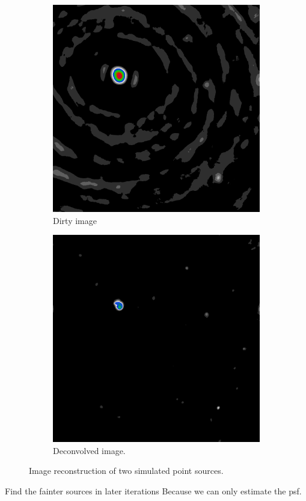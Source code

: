 \begin{figure}[h]
\begin{subfigure}[b]{0.3\linewidth}
		\includegraphics[width=\linewidth]{./chapters/01.intro/mk2/dirty.png}
		\caption{Dirty image}
		\label{results:points:tclean}
	\end{subfigure}
	\begin{subfigure}[b]{0.3\linewidth}
		\includegraphics[width=\linewidth]{./chapters/01.intro/mk2/clean.png}
		\caption{Deconvolved image.}
		\label{results:points:tclean}
	\end{subfigure}
	
	
	\caption{Image reconstruction of two simulated point sources.}
	\label{results:points}
\end{figure}
Find the fainter sources in later iterations
Because we can only estimate the psf.



